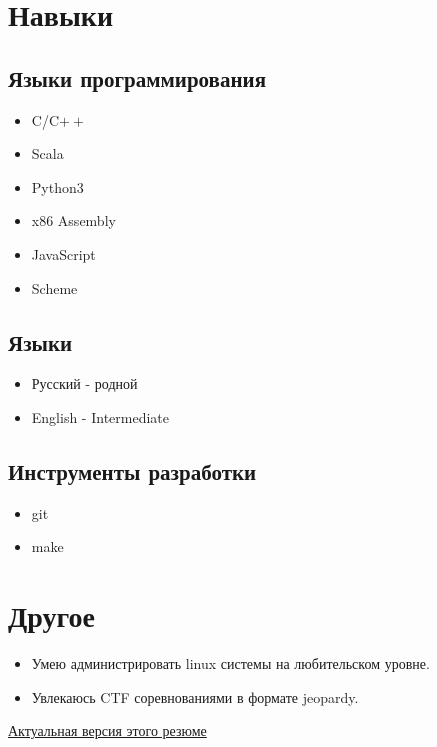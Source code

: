 \documentclass{article}
\begin{document}
    \section{Навыки}
        \begin{multicols}{2}
            \subsection{Языки программирования}
                \begin{itemize}
                    \item C/C$\boldsymbol{++}$
                    \item Scala
                    \item Python3
                    \item x86 Assembly
                    \item JavaScript
                    \item Scheme
                \end{itemize}
            \subsection{Языки}
                \begin{itemize}
                    \item Русский - родной
                    \item English - Intermediate
                \end{itemize}
            \subsection{Инструменты разработки}
                \begin{itemize}
                    \item git
                    \item make
                \end{itemize}
        \end{multicols}
        
    \section{Другое}
        \begin{itemize}
        \item Умею администрировать linux системы на любительском уровне.
            \item Увлекаюсь CTF соревнованиями в формате jeopardy. 
        \end{itemize}
    \vspace{\fill}
    \begin{center}
        \large
        \href {https://github.com/InversionSpaces/resume}{Актуальная версия этого резюме}
    \end{center}
\end{document}
